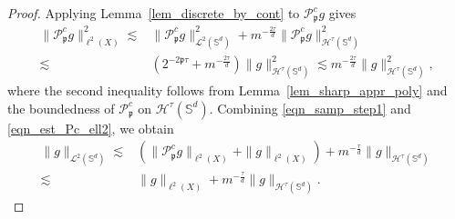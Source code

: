 \documentclass[10pt,a4paper]{amsart}
\def\SS{\mathbb{S}}
\def\pc{\mathcal{P}^c}
\begin{document}
\begin{proof}
Applying Lemma~\ref{lem_discrete_by_cont} to $\pc_{\mathfrak p}g$ gives
\begin{equation}\label{eqn_est_Pc_ell2}
    \begin{split}
        \|\pc_{\mathfrak p}g\|_{\ell^2(X)}^2
        \lesssim&\|\pc_{\mathfrak p}g\|_{\mathcal L^2(\SS^d)}^2
        +m^{-\frac{2\tau}{d}}\|\pc_{\mathfrak p}g\|_{\mathcal H^\tau(\SS^d)}^2\\
        \lesssim&\left(2^{-2\mathfrak p\tau}+m^{-\frac{2\tau}{d}}\right)
        \|g\|_{\mathcal H^\tau(\SS^d)}^2
        \lesssim m^{-\frac{2\tau}{d}}\|g\|_{\mathcal H^\tau(\SS^d)}^2,
    \end{split}
\end{equation}
where the second inequality follows from Lemma~\ref{lem_sharp_appr_poly} and the boundedness of $\pc_{\mathfrak p}$ on $\mathcal H^\tau(\SS^d)$. Combining \eqref{eqn_samp_step1} and \eqref{eqn_est_Pc_ell2}, we obtain
\begin{equation}\label{eqn:L2_by_discrete}
    \begin{split}
        \|g\|_{\mathcal L^2(\SS^d)}
        \lesssim&\left(\|\pc_{\mathfrak p}g\|_{\ell^2(X)}+\|g\|_{\ell^2(X)}\right)
        +m^{-\frac{\tau}{d}}\|g\|_{\mathcal H^\tau(\SS^d)}\\
        \lesssim&\|g\|_{\ell^2(X)}+m^{-\frac{\tau}{d}}\|g\|_{\mathcal H^\tau(\SS^d)}.
    \end{split}
\end{equation}


\end{proof}
\end{document}
